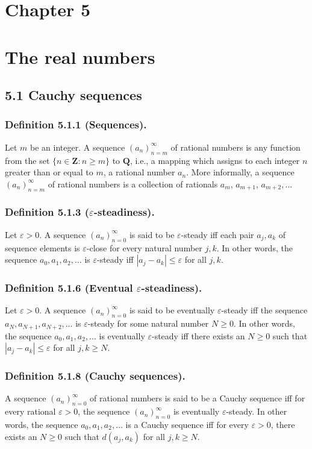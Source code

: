 \documentclass[12pt, letter]{article}
\begin{document}
\section*{Chapter 5}
\section*{The real numbers}
\subsection*{5.1 Cauchy sequences}
\subsubsection*{Definition 5.1.1 (Sequences).}
Let $m$ be an integer. A sequence $(a_n)_{n=m}^{\infty}$ of rational numbers is any function from the set $\{n\in\mathbf{Z}:n\geq m\}$ to $\mathbf{Q}$, i.e.,
a mapping which assigns to each integer $n$ greater than or equal to $m$, a rational number $a_n$. More informally, a sequence $(a_n)_{n=m}^\infty$ of rational 
numbers is a collection of rationals $a_m$, $a_{m+1}$, $a_{m+2},\dotsc$
\subsubsection*{Definition 5.1.3 ($\varepsilon$-steadiness).}
Let $\varepsilon>0$. A sequence $(a_n)_{n=0}^\infty$ is said to be $\varepsilon$-steady iff each pair $a_j,a_k$ of sequence elements is $\varepsilon$-close for 
every natural number $j,k$. In other words, the sequence $a_0,a_1,a_2,\dotsc$ is $\varepsilon$-steady iff $|a_j-a_k|\leq\varepsilon$ for all $j,k$.
\subsubsection*{Definition 5.1.6 (Eventual $\varepsilon$-steadiness).}
Let $\varepsilon>0$. A sequence $(a_n)_{n=0}^\infty$ is said to be eventually $\varepsilon$-steady iff the sequence $a_N,a_{N+1},a_{N+2},\dotsc$ is $\varepsilon$-steady 
for some natural number $N\geq 0$. In other words, the sequence $a_0,a_1,a_2,\dotsc$ is eventually $\varepsilon$-steady iff there exists an $N\geq 0$ such that 
$|a_j-a_k|\leq\varepsilon$ for all $j,k\geq N$.
\subsubsection*{Definition 5.1.8 (Cauchy sequences).}
A sequence $(a_n)_{n=0}^\infty$ of rational numbers is said to be a Cauchy sequence iff for every rational $\varepsilon>0$, the sequence $(a_n)_{n=0}^\infty$ is 
eventually $\varepsilon$-steady. In other words, the sequence $a_0,a_1,a_2,\dotsc$ is a Cauchy sequence iff for every $\varepsilon>0$, there exists an $N\geq 0$
such that $d(a_j,a_k)$ for all $j,k\geq N$.
\end{document}

